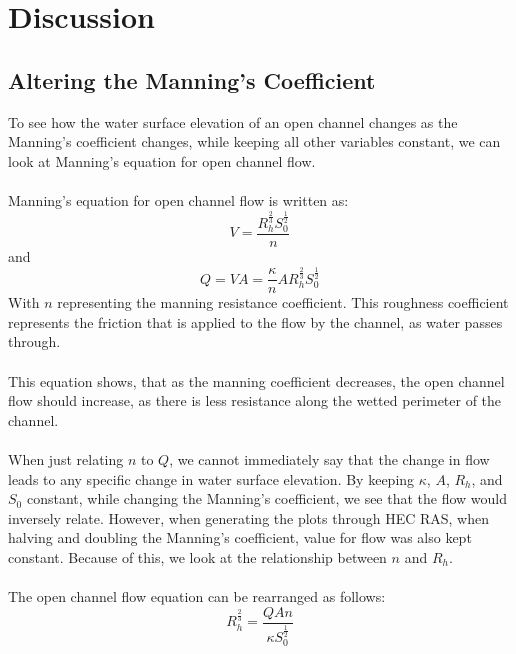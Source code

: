 \documentclass{article}
\begin{document}
\newpage


\section{Discussion}
\subsection{Altering the Manning's Coefficient}
\noindent To see how the water surface elevation of an open channel changes as the Manning's coefficient changes, while keeping all other variables constant, we can look at Manning's equation for open channel flow. \\\\
Manning's equation for open channel flow is written as:
\[V=\frac{R_h^{\frac{2}{3}}S_0^{\frac{1}{2}}}{n}\] 
and
\[Q=VA=\frac{\kappa}{n}AR_h^{\frac{2}{3}}S_0^{\frac{1}{2}}\] 
With $n$ representing the manning resistance coefficient. This roughness coefficient represents the friction that is applied to the flow by the channel, as water passes through.\\\\
This equation shows, that as the manning coefficient decreases, the open channel flow should increase, as there is less resistance along the wetted perimeter of the channel. \\\\
When just relating $n$ to $Q$, we cannot immediately say that the change in flow leads to any specific change in water surface elevation. By keeping $\kappa$, $A$, $R_h$, and $S_0$ constant, while changing the Manning's coefficient, we see that the flow would inversely relate. However, when generating the plots through HEC RAS, when halving and doubling the Manning's coefficient, value for flow was also kept constant. Because of this, we look at the relationship between $n$ and $R_h$.\\\\
The open channel flow equation can be rearranged as follows:  
\[R_h^{\frac{2}{3}}=\frac{QAn}{\kappa S_0^{\frac{1}{2}}}\] 
\end{document}
